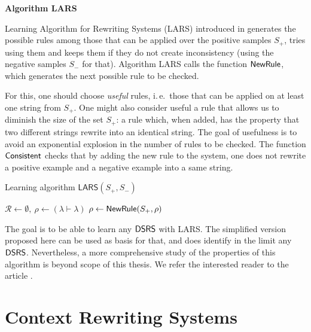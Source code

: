 {\bf Algorithm LARS}\label{section:lars}

Learning Algorithm for Rewriting Systems (LARS) introduced in \cite{Eyraud2007} generates the possible rules among those that can be applied over the positive samples $S_+$, tries using them and keeps them if they do not create inconsistency (using the negative samples $S_-$ for that). Algorithm LARS calls the function $\textup{\sf NewRule}$, which generates the next possible rule to be checked.

For this, one should choose \emph{useful} rules, i.\,e.\ those that can be applied on at least one string from $S_+$. One might also consider useful a rule that allows us to diminish the size of the set $S_+$: a rule which, when added, has the property that two different strings rewrite into an identical string. The goal of usefulness is to avoid an exponential explosion in the number of rules to be checked. The function $\textup{\sf Consistent}$ checks that by adding the new rule to the system, one does not rewrite a positive example and a negative example into a same string.


\begin{algorithm}
\caption{Learning algorithm $\mathsf{LARS}(S_+, S_-)$}
\label{algorithm:lars}
\LinesNumbered
{}
$\mathcal{R} \gets \emptyset,\ \rho \gets (\lambda \vdash \lambda)$\;
{$\rho \gets \textup{\sf NewRule}(S_+, \rho)$\;
}
\;
\end{algorithm}

The goal is to be able to learn any $\textup{\sf DSRS}$ with LARS. The simplified version proposed here can be used as basis for that, and does identify in the limit any $\textup{\sf DSRS}$. Nevertheless, a more comprehensive study of the properties of this algorithm is beyond scope of this thesis. We refer the interested reader to the article \cite{Eyraud2007}.

\section{Context Rewriting Systems}
\label{section:context-rewriting-systems}

